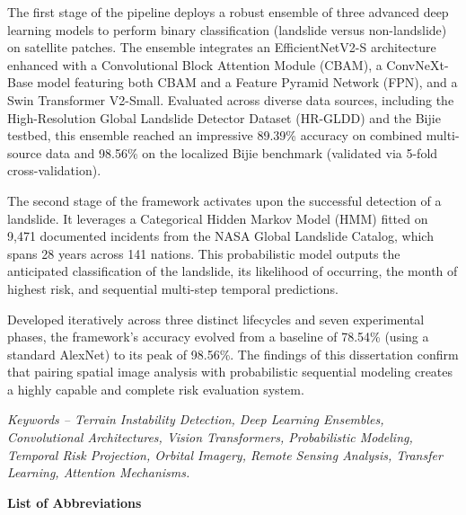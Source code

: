 \documentclass[12pt,a4paper]{report}
\begin{document}
The first stage of the pipeline deploys a robust ensemble of three advanced deep learning models to perform binary classification (landslide versus non-landslide) on satellite patches. The ensemble integrates an EfficientNetV2-S architecture enhanced with a Convolutional Block Attention Module (CBAM), a ConvNeXt-Base model featuring both CBAM and a Feature Pyramid Network (FPN), and a Swin Transformer V2-Small. Evaluated across diverse data sources, including the High-Resolution Global Landslide Detector Dataset (HR-GLDD) and the Bijie testbed, this ensemble reached an impressive 89.39\% accuracy on combined multi-source data and 98.56\% on the localized Bijie benchmark (validated via 5-fold cross-validation).

The second stage of the framework activates upon the successful detection of a landslide. It leverages a Categorical Hidden Markov Model (HMM) fitted on 9,471 documented incidents from the NASA Global Landslide Catalog, which spans 28 years across 141 nations. This probabilistic model outputs the anticipated classification of the landslide, its likelihood of occurring, the month of highest risk, and sequential multi-step temporal predictions.

Developed iteratively across three distinct lifecycles and seven experimental phases, the framework’s accuracy evolved from a baseline of 78.54\% (using a standard AlexNet) to its peak of 98.56\%. The findings of this dissertation confirm that pairing spatial image analysis with probabilistic sequential modeling creates a highly capable and complete risk evaluation system.

\vspace{5mm}
\noindent
\textit{Keywords -- Terrain Instability Detection, Deep Learning Ensembles, Convolutional Architectures, Vision Transformers, Probabilistic Modeling, Temporal Risk Projection, Orbital Imagery, Remote Sensing Analysis, Transfer Learning, Attention Mechanisms.}

\newpage
\tableofcontents
\newpage
\listoffigures
\newpage
\listoftables

\newpage
\begin{center}{\fontsize{16}{19.2}\selectfont\bfseries\color{thesisblue} List of Abbreviations}\end{center}
\vspace{5mm}
\end{document}
